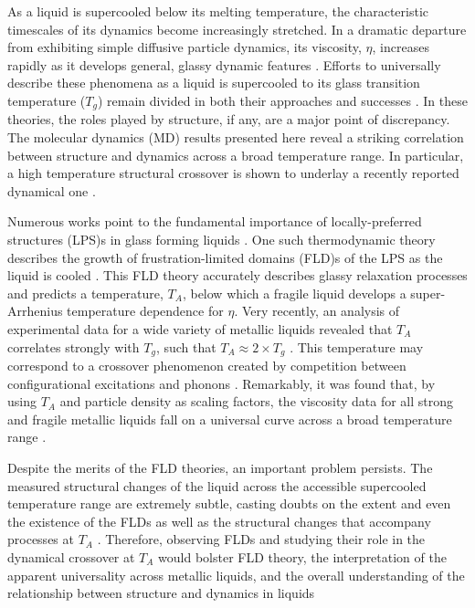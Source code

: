 \documentclass[aps,prl,preprint,showpacs,amsmath,floatfix,superscriptaddress]{revtex4}
\begin{document}
As a liquid is supercooled below its melting temperature, the
characteristic timescales of its dynamics become increasingly
stretched. In a dramatic departure from exhibiting simple
diffusive particle dynamics, its viscosity, $\eta$, increases
rapidly as it develops general, glassy dynamic features
\cite{1970Johari, 2000Angell, 2009Cavagna, 2009Gotze}. Efforts to
universally describe these phenomena as a liquid is supercooled to
its glass transition temperature ($T_{g}$) remain divided in both
their approaches and successes \cite{Karmakar2014, 2009Cavagna,
2009Gotze, Kirkpatrick1989, Debendetti2001, Kivelson2008, Das2004,
Angell2008, Tarjus2005,Tanaka2000, Aharanov2007}. In these
theories, the roles played by structure, if any, are a major point
of discrepancy. The molecular dynamics (MD) results presented here
reveal a striking correlation between structure and dynamics
across a broad temperature range. In particular, a high
temperature structural crossover is shown to underlay a recently
reported dynamical one \cite{Kelton2014}.

Numerous works point to the fundamental importance of
locally-preferred structures (LPS)s in glass forming liquids
\cite{Tarjus2005, Tanaka2010, Chen1988, Baumer2013, Malins2013}. One such
thermodynamic theory describes the growth of frustration-limited
domains (FLD)s of the LPS as the liquid is cooled
\cite{Tarjus2005, Kivelson1995, Nussinov2004}. This FLD theory accurately
describes glassy relaxation processes and predicts a temperature,
$T_{A}$, below which a fragile liquid develops a super-Arrhenius
temperature dependence for $\eta$. Very recently, an analysis of
experimental data for a wide variety of metallic liquids revealed
that $T_{A}$ correlates strongly with $T_{g}$, such that $T_{A}
\approx 2 \times T_{g}$ \cite{Kelton2014}. This temperature may
correspond to a crossover phenomenon created by competition
between configurational excitations and phonons \cite{Iwashita2013}.
Remarkably, it was found that, by using $T_{A}$ and
particle density as scaling factors, the viscosity data for all
strong and fragile metallic liquids fall on a universal curve
across a broad temperature range \cite{Kivelson1995,Kelton2014}.

Despite the merits of the FLD theories, an important problem
persists.  The measured structural changes of the liquid across
the accessible supercooled temperature range are extremely subtle,
casting doubts on the extent and even the existence of the FLDs
\cite{2009Cavagna, Kivelson2008} as well as the structural changes
that accompany processes at $T_{A}$ \cite{Chen1988, Iwashita2013}.
Therefore, observing FLDs and studying their role in the dynamical
crossover at $T_{A}$ would bolster FLD theory, the interpretation
of the apparent universality across metallic liquids, and the
overall understanding of the relationship between structure and
dynamics in liquids
\end{document}
